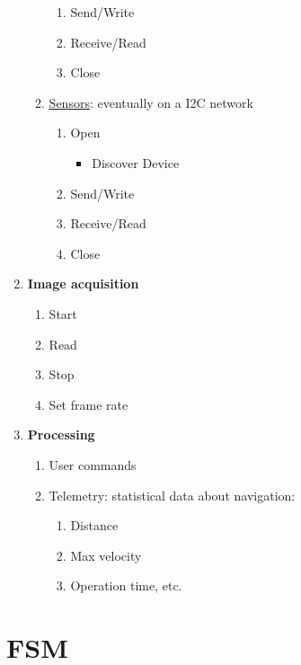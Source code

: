 \documentclass[11pt]{article}
\begin{document}
\begin{enumerate}
\begin{enumerate}
\begin{enumerate}
\item Send/Write
\item Receive/Read
\item Close
\end{enumerate}
\item \uline{Sensors}: eventually on a I2C network 
\begin{enumerate}
\item Open
\begin{itemize}
\item Discover Device
\end{itemize}
\item Send/Write
\item Receive/Read
\item Close
\end{enumerate}
\end{enumerate}
\item \textbf{Image acquisition}
\begin{enumerate}
\item Start
\item Read
\item Stop
\item Set frame rate
\end{enumerate}
\item \textbf{Processing}
\begin{enumerate}
\item User commands
\item Telemetry: statistical data about navigation:
\begin{enumerate}
\item Distance
\item Max velocity
\item Operation time, etc.
\end{enumerate}
\end{enumerate}
\end{enumerate}
\section{FSM}
\label{sec:org81c4aeb}
\end{document}

